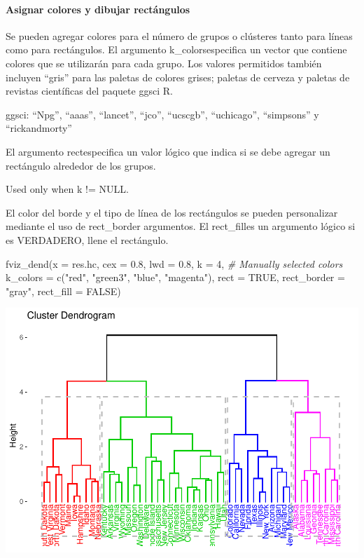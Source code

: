 \documentclass[
]{article}
\newenvironment{Shaded}{\begin{snugshade}}{\end{snugshade}}
\newcommand{\AttributeTok}[1]{\textcolor[rgb]{0.77,0.63,0.00}{#1}}
\newcommand{\CommentTok}[1]{\textcolor[rgb]{0.56,0.35,0.01}{\textit{#1}}}
\newcommand{\ConstantTok}[1]{\textcolor[rgb]{0.00,0.00,0.00}{#1}}
\newcommand{\DecValTok}[1]{\textcolor[rgb]{0.00,0.00,0.81}{#1}}
\newcommand{\FloatTok}[1]{\textcolor[rgb]{0.00,0.00,0.81}{#1}}
\newcommand{\FunctionTok}[1]{\textcolor[rgb]{0.00,0.00,0.00}{#1}}
\newcommand{\NormalTok}[1]{#1}
\newcommand{\StringTok}[1]{\textcolor[rgb]{0.31,0.60,0.02}{#1}}
\begin{document}
\hypertarget{asignar-colores-y-dibujar-rectuxe1ngulos}{%
\paragraph{Asignar colores y dibujar
rectángulos}\label{asignar-colores-y-dibujar-rectuxe1ngulos}}

Se pueden agregar colores para el número de grupos o clústeres tanto
para líneas como para rectángulos. El argumento k\_colorsespecifica un
vector que contiene colores que se utilizarán para cada grupo. Los
valores permitidos también incluyen ``gris'' para las paletas de colores
grises; paletas de cerveza y paletas de revistas científicas del paquete
ggsci R.

ggsci: ``Npg'', ``aaas'', ``lancet'', ``jco'', ``ucscgb'', ``uchicago'',
``simpsons'' y ``rickandmorty''

El argumento rectespecifica un valor lógico que indica si se debe
agregar un rectángulo alrededor de los grupos.

Used only when k != NULL.

El color del borde y el tipo de línea de los rectángulos se pueden
personalizar mediante el uso de rect\_border argumentos. El rect\_filles
un argumento lógico si es VERDADERO, llene el rectángulo.

\begin{Shaded}
\begin{Highlighting}[]
\FunctionTok{fviz\_dend}\NormalTok{(}\AttributeTok{x =}\NormalTok{ res.hc, }\AttributeTok{cex =} \FloatTok{0.8}\NormalTok{, }\AttributeTok{lwd =} \FloatTok{0.8}\NormalTok{, }\AttributeTok{k =} \DecValTok{4}\NormalTok{,}
\CommentTok{\# Manually selected colors}
          \AttributeTok{k\_colors =} \FunctionTok{c}\NormalTok{(}\StringTok{"red"}\NormalTok{, }\StringTok{"green3"}\NormalTok{, }\StringTok{"blue"}\NormalTok{, }\StringTok{"magenta"}\NormalTok{),}
          \AttributeTok{rect =} \ConstantTok{TRUE}\NormalTok{, }
          \AttributeTok{rect\_border =} \StringTok{"gray"}\NormalTok{, }
          \AttributeTok{rect\_fill =} \ConstantTok{FALSE}\NormalTok{)}
\end{Highlighting}
\end{Shaded}

\includegraphics{clusterjerarquico1_files/figure-latex/unnamed-chunk-10-1.pdf}
\end{document}
